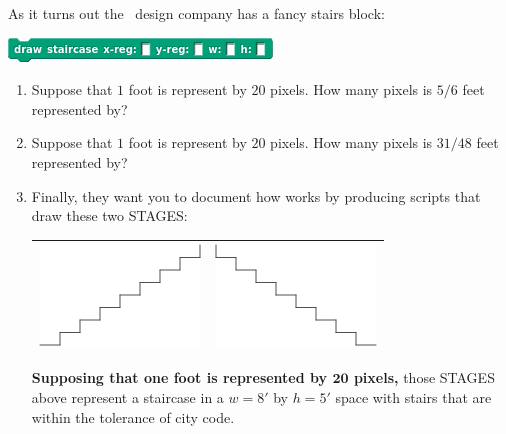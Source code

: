 \documentclass[noauthor,nooutcomes,12pt,hints,handout]{ximera}
\begin{document}
\begin{question}%
  As it turns out the \mooculus\ design company has a fancy stairs
  block:
  \begin{center}
  \includegraphics{drawStaircaseBlockBlank.png}
  \end{center}
  \begin{enumerate}
    \item Suppose that $1$ foot is represent by $20$ pixels. How many
      pixels is $5/6$ feet represented by?
    \item Suppose that $1$ foot is represent by $20$ pixels. How many
      pixels is $31/48$ feet represented by?
    \item Finally, they want you to document how
       works
      by producing scripts that draw these two STAGES:
      \begin{center}
        \begin{tabular}{|c||c|}\hline
          \includegraphics{fwdStairStage.png} & \includegraphics{backStairStage.png} \\ \hline
        \end{tabular}
      \end{center}
      \textbf{Supposing that one foot is represented by $\boldsymbol{20}$
        pixels,} those STAGES above represent a staircase in a $w=8'$ by
      $h=5'$ space with stairs that are within the tolerance of city
      code.
      

\end{enumerate}
\end{question}
\end{document}
